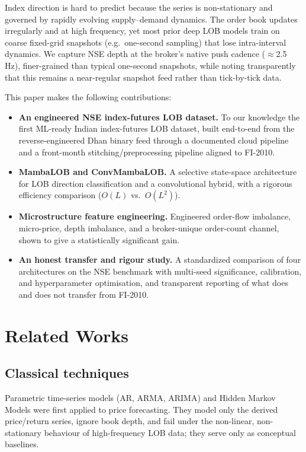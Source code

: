 \documentclass[10pt,twocolumn]{article}
\begin{document}
Index direction is hard to predict because the series is non-stationary and governed by rapidly evolving
supply--demand dynamics. The order book updates irregularly and at high frequency, yet most prior deep LOB
models train on coarse fixed-grid snapshots (e.g.\ one-second sampling) that lose intra-interval dynamics. We
capture NSE depth at the broker's native push cadence ($\approx$2.5\,Hz), finer-grained than typical
one-second snapshots, while noting transparently that this remains a near-regular snapshot feed rather than
tick-by-tick data.

This paper makes the following contributions:
\begin{itemize}
\item \textbf{An engineered NSE index-futures LOB dataset.} To our knowledge the first ML-ready Indian
index-futures LOB dataset, built end-to-end from the reverse-engineered Dhan binary feed through a documented
cloud pipeline and a front-month stitching/preprocessing pipeline aligned to FI-2010.
\item \textbf{MambaLOB and ConvMambaLOB.} A selective state-space architecture for LOB direction
classification and a convolutional hybrid, with a rigorous efficiency comparison ($O(L)$ vs.\ $O(L^2)$).
\item \textbf{Microstructure feature engineering.} Engineered order-flow imbalance, micro-price, depth
imbalance, and a broker-unique order-count channel, shown to give a statistically significant gain.
\item \textbf{An honest transfer and rigour study.} A standardized comparison of four architectures on the
NSE benchmark with multi-seed significance, calibration, and hyperparameter optimisation, and transparent
reporting of what does and does not transfer from FI-2010.
\end{itemize}

\section{Related Works}
\subsection{Classical techniques}
Parametric time-series models (AR, ARMA, ARIMA) and Hidden Markov Models were first applied to price
forecasting. They model only the derived price/return series, ignore book depth, and fail under the
non-linear, non-stationary behaviour of high-frequency LOB data; they serve only as conceptual baselines.
\end{document}
